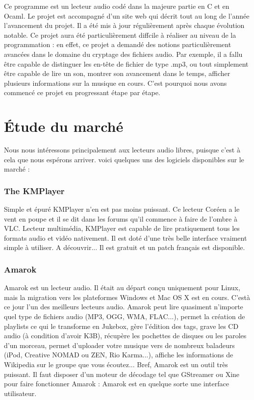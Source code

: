 \documentclass[12pt,a4paper]{report}
\begin{document}
Ce programme est un lecteur audio codé dans la majeure partie en C et en Ocaml. Le projet est accompagné d'un site web qui décrit tout au long de l'année l'avancement du projet. Il a été mis à jour régulièrement après chaque évolution notable. Ce projet aura été particulièrement diffcile à réaliser au niveau de la programmation : en effet, ce projet a demandé des notions particulièrement avancées dans le domaine du cryptage des fichiers audio. Par exemple, il a fallu être capable de distinguer les en-tête de fichier de type .mp3, ou tout simplement être capable de lire un son, montrer son avancement dans le temps, afficher plusieurs informations sur la musique en cours. C'est pourquoi nous avons commencé ce projet en progressant étape par étape.

\section{Étude du marché}
Nous nous intéressons principalement aux lecteurs audio libres, puisque c'est à cela que nous espérons arriver. voici quelques uns des logiciels disponibles sur le marché :

\subsubsection{The KMPlayer}

Simple et épuré KMPlayer n'en est pas moins puissant. Ce lecteur Coréen a le vent en poupe et il se dit dans les forums qu'il commence à faire de l'ombre à VLC. Lecteur multimédia, KMPlayer est capable de lire pratiquement tous les formats audio et vidéo nativement. Il est doté d'une très belle interface vraiment simple à  utiliser. A découvrir... Il est gratuit et un patch français est disponible.

\subsubsection{Amarok}

Amarok est un lecteur audio. Il était au départ conçu uniquement pour Linux, mais la migration vers les plateformes Windows et Mac OS X est en cours. C'est\`a ce jour l'un des meilleurs lecteurs audio. 
Amarok peut lire quasiment n'importe quel type de fichiers audio (MP3, OGG, WMA, FLAC...), permet la création de playlists ce qui le transforme en Jukebox, gère l'édition des tags, grave les CD audio (à condition d'avoir K3B), récupère les pochettes de disques ou les paroles d'un morceau, permet d'uploader votre musique vers de nombreux baladeurs (iPod, Creative NOMAD ou ZEN, Rio Karma...), affiche les informations de Wikipedia sur le groupe que vous écoutez... Bref, Amarok est un outil très puissant.
Il faut disposer d'un moteur de décodage tel que GStreamer ou Xine pour faire fonctionner Amarok : Amarok est en quelque sorte une interface utilisateur. 
\end{document}
